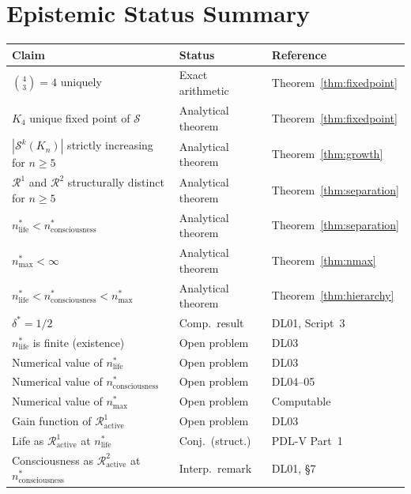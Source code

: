 \documentclass[12pt,a4paper]{article}
\theoremstyle{plain}
\theoremstyle{definition}
\theoremstyle{remark}
\newcommand{\Sop}{\mathcal{S}}
\newcommand{\Rop}{\mathcal{R}}
\newcommand{\nlife}{n^{*}_{\mathrm{life}}}
\newcommand{\ncons}{n^{*}_{\mathrm{consciousness}}}
\newcommand{\nmax}{n^{*}_{\mathrm{max}}}
\newcommand{\deltastar}{\delta^{*}}
\begin{document}
\section{Epistemic Status Summary}
\label{sec:epistemic}

\begin{center}
\begin{longtable}{p{7cm}p{2.5cm}p{3.5cm}}
\toprule
\textbf{Claim} & \textbf{Status} & \textbf{Reference} \\
\midrule
\endhead
$\binom{4}{3} = 4$ uniquely & Exact arithmetic & Theorem~\ref{thm:fixedpoint} \\
$K_4$ unique fixed point of $\Sop$ & Analytical theorem & Theorem~\ref{thm:fixedpoint} \\
$|\Sop^k(K_n)|$ strictly increasing for $n \geq 5$ & Analytical theorem & Theorem~\ref{thm:growth} \\
$\Rop^1$ and $\Rop^2$ structurally distinct for $n \geq 5$ & Analytical theorem & Theorem~\ref{thm:separation} \\
$\nlife < \ncons$ & Analytical theorem & Theorem~\ref{thm:separation} \\
$\nmax < \infty$ & Analytical theorem & Theorem~\ref{thm:nmax} \\
$\nlife < \ncons < \nmax$ & Analytical theorem & Theorem~\ref{thm:hierarchy} \\
$\deltastar = 1/2$ & Comp.\ result & DL01, Script~3 \\
\midrule
$\nlife$ is finite (existence) & Open problem & DL03 \\
Numerical value of $\nlife$ & Open problem & DL03 \\
Numerical value of $\ncons$ & Open problem & DL04--05 \\
Numerical value of $\nmax$ & Open problem & Computable \\
Gain function of $\Rop^1_{\mathrm{active}}$ & Open problem & DL03 \\
\midrule
Life as $\Rop^1_{\mathrm{active}}$ at $\nlife$ & Conj.\ (struct.) & PDL-V Part~1 \\
Consciousness as $\Rop^2_{\mathrm{active}}$ at $\ncons$ & Interp.\ remark & DL01, §7 \\
\bottomrule
\end{longtable}
\end{center}

\end{document}
